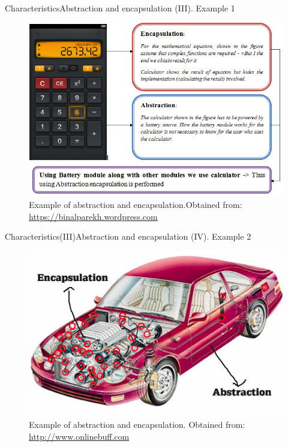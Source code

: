 \documentclass[10pt,compress]{beamer} %
\begin{document}
\begin{frame}{Characteristics}{Abstraction and encapsulation (III). Example 1}
	\begin{figure}
		\includegraphics[scale=0.4]{figs/abstraccion1}
		\caption{{\scriptsize Example of abstraction and encapsulation.Obtained from: \url{https://binalparekh.wordpress.com}}}
	\end{figure}
\end{frame}

\begin{frame}{Characteristics(III)}{Abstraction and encapsulation (IV). Example 2}
	\begin{figure}
		\includegraphics[scale=0.45]{figs/abstraccion2}
		\caption{{\scriptsize Example of abstraction and encapsulation. Obtained from: \url{http://www.onlinebuff.com}}}
	\end{figure}
\end{frame}
\end{document}
